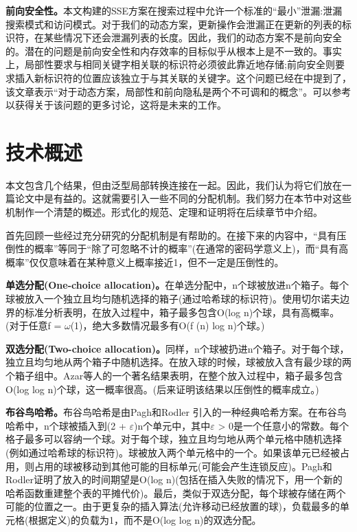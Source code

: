 \documentclass[UTF8]{article}
\begin{document}
\textbf{前向安全性。}本文构建的SSE方案在搜索过程中允许一个标准的“最小”泄漏:泄漏搜索模式和访问模式。对于我们的动态方案，更新操作会泄漏正在更新的列表的标识符，在某些情况下还会泄漏列表的长度。因此，我们的动态方案不是前向安全的。潜在的问题是前向安全性和内存效率的目标似乎从根本上是不一致的。事实上，局部性要求与相同关键字相关联的标识符必须彼此靠近地存储;前向安全则要求插入新标识符的位置应该独立于与其关联的关键字。这个问题已经在\cite{RaphaelBost2016ooFS}中提到了，该文章表示“对于动态方案，局部性和前向隐私是两个不可调和的概念”。可以参考\cite{RaphaelBost2016ooFS}以获得关于该问题的更多讨论，这将是未来的工作。
\section{技术概述}
本文包含几个结果，但由泛型局部转换连接在一起。因此，我们认为将它们放在一篇论文中是有益的。这就需要引入一些不同的分配机制。我们努力在本节中对这些机制作一个清楚的概述。形式化的规范、定理和证明将在后续章节中介绍。

首先回顾一些经过充分研究的分配机制是有帮助的。在接下来的内容中，“具有压倒性的概率”等同于“除了可忽略不计的概率”(在通常的密码学意义上)，而“具有高概率”仅仅意味着在某种意义上概率接近1，但不一定是压倒性的。

\textbf{单选分配(One-choice allocation)。}在单选分配中，n个球被放进n个箱子。每个球被放入一个独立且均匀随机选择的箱子(通过哈希球的标识符)。使用切尔诺夫边界的标准分析表明，在放入过程中，箱子最多包含O(log n)个球，具有高概率\cite{DASprott1978UrnMA}。(对于任意f = $\omega$(1)，绝大多数情况最多有O(f (n) log n)个球。)

\textbf{双选分配(Two-choice allocation)。}同样，n个球被扔进n个箱子。对于每个球，独立且均匀地从两个箱子中随机选择。在放入球的时候，球被放入含有最少球的两个箱子组中。Azar等人的一个著名结果表明，在整个放入过程中，箱子最多包含O(log log n)个球，这一概率很高\cite{YossiAzar1999BalancedA}。(后来证明该结果以压倒性的概率成立\cite{MichaelMitzenmacher2001ThePO}。)

\textbf{布谷鸟哈希。}布谷鸟哈希是由Pagh和Rodler \cite{RasmusPagh2001CuckooH}引入的一种经典哈希方案。在布谷鸟哈希中，n个球被插入到(2 + $\varepsilon$)n个单元中，其中$\varepsilon$ > 0是一个任意小的常数。每个格子最多可以容纳一个球。对于每个球，独立且均匀地从两个单元格中随机选择(例如通过哈希球的标识符)。球被放入两个单元格中的一个。如果该单元已经被占用，则占用的球被移动到其他可能的目标单元(可能会产生连锁反应)。Pagh和Rodler证明了放入的时间期望是O(log n)\cite{RasmusPagh2001CuckooH}(包括在插入失败的情况下，用一个新的哈希函数重建整个表的平摊代价)。最后，类似于双选分配，每个球被存储在两个可能的位置之一。由于更复杂的插入算法(允许移动已经放置的球)，负载最多的单元格(根据定义)的负载为1，而不是O(log log n)的双选分配。
\end{document}
